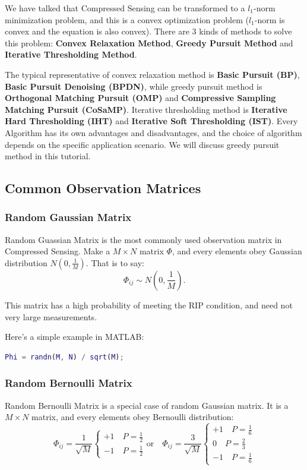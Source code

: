 \documentclass[12pt]{ctexart}
\begin{document}
We have talked that Compressed Sensing can be transformed to a $l_1$-norm minimization
problem, and this is a convex optimization problem ($l_1$-norm is convex and the equation
is also convex). There are 3 kinds of methods to solve this problem: \textbf{Convex Relaxation
Method}, \textbf{Greedy Pursuit Method} and \textbf{Iterative Thresholding Method}.

The typical representative of convex relaxation method is \textbf{Basic Pursuit (BP)},
\textbf{Basic Pursuit Denoising (BPDN)}, while greedy pursuit method is \textbf{Orthogonal
Matching Pursuit (OMP)} and \textbf{Compressive Sampling Matching Pursuit (CoSaMP)}. 
Iterative thresholding method is \textbf{Iterative Hard Thresholding (IHT)} and
\textbf{Iterative Soft Thresholding (IST)}. Every Algorithm has its own advantages and
disadvantages, and the choice of algorithm depends on the specific application scenario.
We will discuss greedy pursuit method in this tutorial.

\subsection{\textbf{Common Observation Matrices}}

\subsubsection{\textbf{Random Gaussian Matrix}}

Random Guassian Matrix is the most commonly used observation matrix in Compressed Sensing.
Make a $M \times N$ matrix $\Phi$, and every elements obey Gaussian distribution
$N (0,\frac{1}{M})$. That is to say:
\[
  \Phi_{ij} \sim N(0, \frac{1}{M}).
\]

This matrix has a high probability of meeting the RIP condition, and need not very large
measurements.

Here's a simple example in MATLAB:

\begin{lstlisting}[language=Matlab]
%% Random Gaussian Matrix Example
Phi = randn(M, N) / sqrt(M);
\end{lstlisting}

\subsubsection{\textbf{Random Bernoulli Matrix}}

Random Bernoulli Matrix is a special case of random Gaussian matrix. It is a $M \times N$
matrix, and every elements obey Bernoulli distribution:
\[
  \Phi_{ij} = \frac{1}{\sqrt{M}}
  \begin{cases}
    +1 \quad P=\tfrac12 \\
    -1 \quad P=\tfrac12
  \end{cases}
  \text{or} \quad
  \Phi_{ij} = \frac{3}{\sqrt{M}}
  \begin{cases}
    +1 \quad P=\tfrac16 \\
    0 \quad P=\tfrac23 \\
    -1 \quad P=\tfrac16
  \end{cases}
\]
\end{document}
